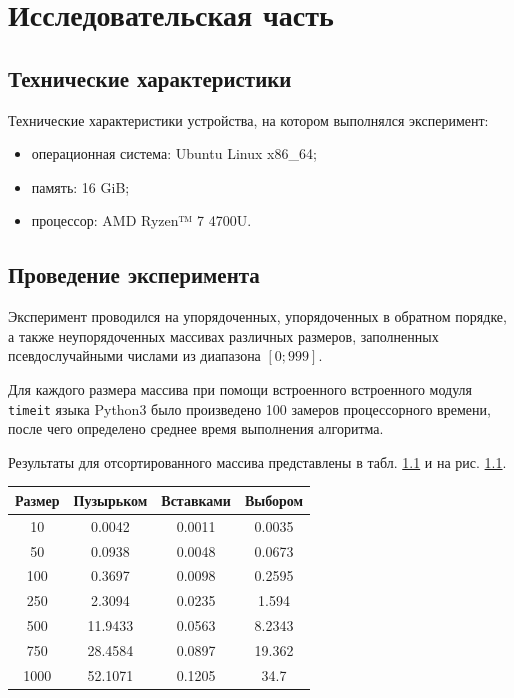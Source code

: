 \chapter{Исследовательская часть}

\section{Технические характеристики}

Технические характеристики устройства, на котором выполнялся эксперимент:
\begin{itemize}
	\item операционная система: Ubuntu\cite{ubuntu} Linux x86\_64;
	\item память: 16 GiB;
	\item процессор: AMD Ryzen™ 7 4700U\cite{amd}.
\end{itemize}

\section{Проведение эксперимента}

Эксперимент проводился на упорядоченных, упорядоченных в обратном порядке, а также неупорядоченных
массивах различных размеров, заполненных псевдослучайными числами из диапазона $[0; 999]$.

Для каждого размера массива при помощи встроенного встроенного модуля \texttt{timeit}\cite{timeit} языка Python3
было произведено 100 замеров процессорного времени, после чего определено среднее время выполнения алгоритма.

Результаты для отсортированного массива представлены в табл. \ref{tab:profiling-fwd} и на рис. \ref{tab:profiling-fwd}.
\begin{table}[!ht]
	\begin{center}
		\begin{tabular}{|c|c|c|c|} 
			\hline
			Размер & Пузырьком & Вставками & Выбором \\  
			\hline
			10 & 0.0042 & 0.0011 & 0.0035 \\
			\hline
			50 & 0.0938 & 0.0048 & 0.0673 \\
			\hline
			100 & 0.3697 & 0.0098 & 0.2595 \\
			\hline
			250 & 2.3094 & 0.0235 & 1.594 \\
			\hline
			500 & 11.9433 & 0.0563 & 8.2343 \\
			\hline
			750 & 28.4584 & 0.0897 & 19.362 \\
			\hline
			1000 & 52.1071 & 0.1205 & 34.7 \\
			\hline
		\end{tabular}
		\label{tab:profiling-fwd}
	\end{center}
\end{table}

